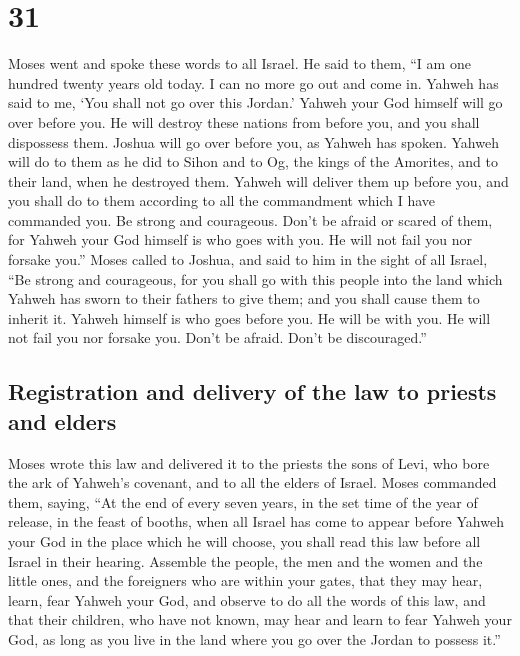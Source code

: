 \hypertarget{section-30}{%
\section{31}\label{section-30}}

 Moses went and spoke these words to all Israel.
 He said to them, ``I am one hundred twenty years old
today. I can no more go out and come in. Yahweh has said to me, `You
shall not go over this Jordan.'  Yahweh your God himself
will go over before you. He will destroy these nations from before you,
and you shall dispossess them. Joshua will go over before you, as Yahweh
has spoken.  Yahweh will do to them as he did to Sihon and
to Og, the kings of the Amorites, and to their land, when he destroyed
them.  Yahweh will deliver them up before you, and you
shall do to them according to all the commandment which I have commanded
you.  Be strong and courageous. Don't be afraid or scared
of them, for Yahweh your God himself is who goes with you. He will not
fail you nor forsake you.''  Moses called to Joshua, and
said to him in the sight of all Israel, ``Be strong and courageous, for
you shall go with this people into the land which Yahweh has sworn to
their fathers to give them; and you shall cause them to inherit it.
 Yahweh himself is who goes before you. He will be with
you. He will not fail you nor forsake you. Don't be afraid. Don't be
discouraged.''

\hypertarget{registration-and-delivery-of-the-law-to-priests-and-elders}{%
\subsection{Registration and delivery of the law to priests and
elders}\label{registration-and-delivery-of-the-law-to-priests-and-elders}}

 Moses wrote this law and delivered it to the priests the
sons of Levi, who bore the ark of Yahweh's covenant, and to all the
elders of Israel.  Moses commanded them, saying, ``At the
end of every seven years, in the set time of the year of release, in the
feast of booths,  when all Israel has come to appear
before Yahweh your God in the place which he will choose, you shall read
this law before all Israel in their hearing.  Assemble
the people, the men and the women and the little ones, and the
foreigners who are within your gates, that they may hear, learn, fear
Yahweh your God, and observe to do all the words of this law,
 and that their children, who have not known, may hear
and learn to fear Yahweh your God, as long as you live in the land where
you go over the Jordan to possess it.''

